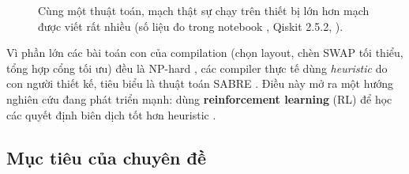 \begin{figure}[h]
  \centering
  \caption{Cùng một thuật toán, mạch thật sự chạy trên thiết bị lớn hơn mạch được viết rất nhiều
  (số liệu đo trong notebook , Qiskit 2.5.2, ).}
  \label{fig:motivation}
\end{figure}

Vì phần lớn các bài toán con của compilation (chọn layout, chèn SWAP tối thiểu, tổng hợp cổng tối
ưu) đều là NP-hard \cite{siraichi2018allocation}, các compiler thực tế dùng \emph{heuristic} do con
người thiết kế, tiêu biểu là thuật toán SABRE \cite{li2019sabre}. Điều này mở ra một hướng nghiên cứu
đang phát triển mạnh: dùng \textbf{reinforcement learning} (RL) để học các quyết định biên dịch tốt
hơn heuristic \cite{pozzi2022rlrouting, fosel2021rlopt, ruiz2025alphatensor, riu2025zx}.

\subsection{Mục tiêu của chuyên đề}

